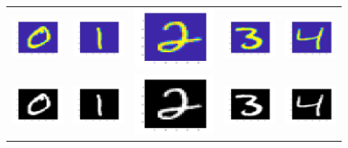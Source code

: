 \documentclass{article} %
\begin{document}
\begin{figure}[H]
\begin{tabular}{ccccc}
\includegraphics[width=0.15\linewidth]{images/0.png}
&
\includegraphics[width=0.15\linewidth]{images/1.png}
&
\includegraphics[width=0.15\linewidth]{images/2.png}
&
\includegraphics[width=0.15\linewidth]{images/3.png}
&
\includegraphics[width=0.15\linewidth]{images/4.png}
\\
\includegraphics[width=0.15\linewidth]{images/0_gray.png}
&
\includegraphics[width=0.15\linewidth]{images/1_gray.png}
&
\includegraphics[width=0.15\linewidth]{images/2_gray.png}
&
\includegraphics[width=0.15\linewidth]{images/3_gray.png}
&
\includegraphics[width=0.15\linewidth]{images/4_gray.png}

\end{tabular}
\end{figure}
\end{document}
